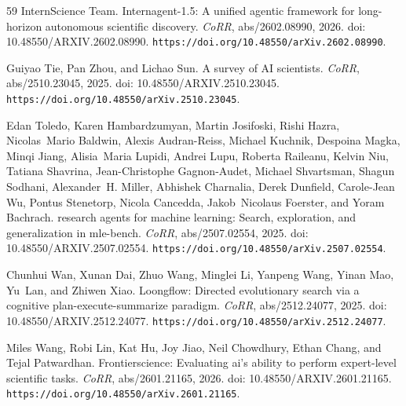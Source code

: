 \documentclass{llmxive}
\providecommand{\url}[1]{\texttt{#1}}
\providecommand{\doi}[1]{doi: #1}
\begin{document}
\begin{thebibliography}{59}
InternScience Team.
\newblock Internagent-1.5: {A} unified agentic framework for long-horizon autonomous scientific discovery.
\newblock \emph{CoRR}, abs/2602.08990, 2026.
\newblock \doi{10.48550/ARXIV.2602.08990}.
\newblock \url{https://doi.org/10.48550/arXiv.2602.08990}.

Guiyao Tie, Pan Zhou, and Lichao Sun.
\newblock A survey of {AI} scientists.
\newblock \emph{CoRR}, abs/2510.23045, 2025.
\newblock \doi{10.48550/ARXIV.2510.23045}.
\newblock \url{https://doi.org/10.48550/arXiv.2510.23045}.

Edan Toledo, Karen Hambardzumyan, Martin Josifoski, Rishi Hazra, Nicolas~Mario Baldwin, Alexis Audran{-}Reiss, Michael Kuchnik, Despoina Magka, Minqi Jiang, Alisia~Maria Lupidi, Andrei Lupu, Roberta Raileanu, Kelvin Niu, Tatiana Shavrina, Jean{-}Christophe Gagnon{-}Audet, Michael Shvartsman, Shagun Sodhani, Alexander~H. Miller, Abhishek Charnalia, Derek Dunfield, Carole{-}Jean Wu, Pontus Stenetorp, Nicola Cancedda, Jakob~Nicolaus Foerster, and Yoram Bachrach.
 research agents for machine learning: Search, exploration, and generalization in mle-bench.
\newblock \emph{CoRR}, abs/2507.02554, 2025.
\newblock \doi{10.48550/ARXIV.2507.02554}.
\newblock \url{https://doi.org/10.48550/arXiv.2507.02554}.

Chunhui Wan, Xunan Dai, Zhuo Wang, Minglei Li, Yanpeng Wang, Yinan Mao, Yu~Lan, and Zhiwen Xiao.
\newblock Loongflow: Directed evolutionary search via a cognitive plan-execute-summarize paradigm.
\newblock \emph{CoRR}, abs/2512.24077, 2025.
\newblock \doi{10.48550/ARXIV.2512.24077}.
\newblock \url{https://doi.org/10.48550/arXiv.2512.24077}.

Miles Wang, Robi Lin, Kat Hu, Joy Jiao, Neil Chowdhury, Ethan Chang, and Tejal Patwardhan.
\newblock Frontierscience: Evaluating ai's ability to perform expert-level scientific tasks.
\newblock \emph{CoRR}, abs/2601.21165, 2026.
\newblock \doi{10.48550/ARXIV.2601.21165}.
\newblock \url{https://doi.org/10.48550/arXiv.2601.21165}.


\end{thebibliography}
\end{document}
